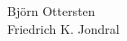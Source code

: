 \documentclass[12pt,a4wide,peerreview]{IEEEtran}
\begin{document}
\hspace{5 pt} Bj\"orn Ottersten\\
\hspace{5 pt} Friedrich K. Jondral \\
%


\end{document}
